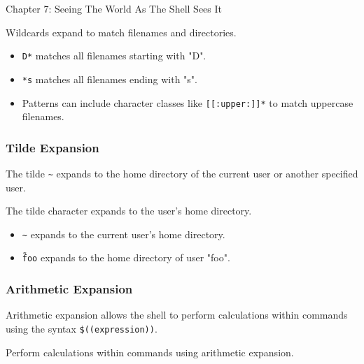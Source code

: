 \begin{notes}{Chapter 7: Seeing The World As The Shell Sees It}
    \begin{highlight}
    
    Wildcards expand to match filenames and directories.
    
    \begin{itemize}
        \item \texttt{D*} matches all filenames starting with "D".
        \item \texttt{*s} matches all filenames ending with "s".
        \item Patterns can include character classes like \texttt{[[:upper:]]*} to match uppercase filenames.
    \end{itemize}
    
    \end{highlight}
    
    \subsubsection*{Tilde Expansion}
    
    The tilde \texttt{\~} expands to the home directory of the current user or another specified user.
    
    \begin{highlight}
    
    The tilde character expands to the user's home directory.
    
    \begin{itemize}
        \item \texttt{\~} expands to the current user's home directory.
        \item \texttt{\~foo} expands to the home directory of user "foo".
    \end{itemize}
    
    \end{highlight}
    
    \subsubsection*{Arithmetic Expansion}
    
    Arithmetic expansion allows the shell to perform calculations within commands using the syntax \texttt{\$((expression))}.
    
    \begin{highlight}
    
    Perform calculations within commands using arithmetic expansion.
    

\end{highlight}
\end{notes}
